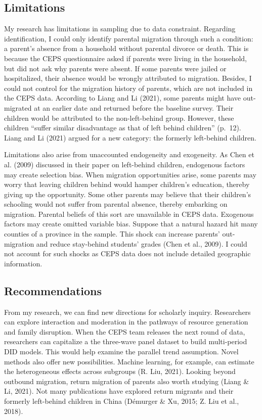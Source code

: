 \documentclass[
  man,floatsintext]{apa7}
\begin{document}
\hypertarget{limitations}{%
\subsection{Limitations}\label{limitations}}

My research has limitations in sampling due to data constraint. Regarding identification, I could only identify parental migration through such a condition: a parent's absence from a household without parental divorce or death. This is because the CEPS questionnaire asked if parents were living in the household, but did not ask why parents were absent. If some parents were jailed or hospitalized, their absence would be wrongly attributed to migration. Besides, I could not control for the migration history of parents, which are not included in the CEPS data. According to Liang and Li (2021), some parents might have out-migrated at an earlier date and returned before the baseline survey. Their children would be attributed to the non-left-behind group. However, these children ``suffer similar disadvantage as that of left behind children'' (p.~12). Liang and Li (2021) argued for a new category: the formerly left-behind children.

Limitations also arise from unaccounted endogeneity and exogeneity. As Chen et al. (2009) discussed in their paper on left-behind children, endogenous factors may create selection bias. When migration opportunities arise, some parents may worry that leaving children behind would hamper children's education, thereby giving up the opportunity. Some other parents may believe that their children's schooling would not suffer from parental absence, thereby embarking on migration. Parental beliefs of this sort are unavailable in CEPS data. Exogenous factors may create omitted variable bias. Suppose that a natural hazard hit many counties of a province in the sample. This shock can increase parents' out-migration and reduce stay-behind students' grades (Chen et al., 2009). I could not account for such shocks as CEPS data does not include detailed geographic information.

\hypertarget{recommendations}{%
\subsection{Recommendations}\label{recommendations}}

From my research, we can find new directions for scholarly inquiry. Researchers can explore interaction and moderation in the pathways of resource generation and family disruption. When the CEPS team releases the next round of data, researchers can capitalize a the three-wave panel dataset to build multi-period DID models. This would help examine the parallel trend assumption. Novel methods also offer new possibilities. Machine learning, for example, can estimate the heterogeneous effects across subgroups (R. Liu, 2021). Looking beyond outbound migration, return migration of parents also worth studying (Liang \& Li, 2021). Not many publications have explored return migrants and their formerly left-behind children in China (Démurger \& Xu, 2015; Z. Liu et al., 2018).
\end{document}
